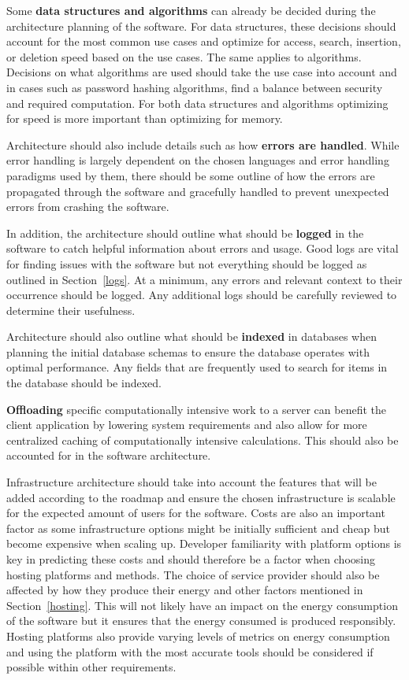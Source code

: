 Some \textbf{data structures and algorithms} can already be decided during the architecture planning of the software. For data structures, these decisions should account for the most common use cases and optimize for access, search, insertion, or deletion speed based on the use cases. The same applies to algorithms. Decisions on what algorithms are used should take the use case into account and in cases such as password hashing algorithms, find a balance between security and required computation. For both data structures and algorithms optimizing for speed is more important than optimizing for memory.

Architecture should also include details such as how \textbf{errors are handled}. While error handling is largely dependent on the chosen languages and error handling paradigms used by them, there should be some outline of how the errors are propagated through the software and gracefully handled to prevent unexpected errors from crashing the software. 

In addition, the architecture should outline what should be \textbf{logged} in the software to catch helpful information about errors and usage. Good logs are vital for finding issues with the software but not everything should be logged as outlined in Section~\ref{logs}. At a minimum, any errors and relevant context to their occurrence should be logged. Any additional logs should be carefully reviewed to determine their usefulness.

Architecture should also outline what should be \textbf{indexed} in databases when planning the initial database schemas to ensure the database operates with optimal performance. Any fields that are frequently used to search for items in the database should be indexed.

\textbf{Offloading} specific computationally intensive work to a server can benefit the client application by lowering system requirements and also allow for more centralized caching of computationally intensive calculations. This should also be accounted for in the software architecture.

Infrastructure architecture should take into account the features that will be added according to the roadmap and ensure the chosen infrastructure is scalable for the expected amount of users for the software. Costs are also an important factor as some infrastructure options might be initially sufficient and cheap but become expensive when scaling up. Developer familiarity with platform options is key in predicting these costs and should therefore be a factor when choosing hosting platforms and methods. The choice of service provider should also be affected by how they produce their energy and other factors mentioned in Section~\ref{hosting}. This will not likely have an impact on the energy consumption of the software but it ensures that the energy consumed is produced responsibly. Hosting platforms also provide varying levels of metrics on energy consumption and using the platform with the most accurate tools should be considered if possible within other requirements.

